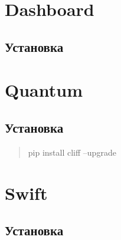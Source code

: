 \documentclass[letterpaper,10pt,russian]{sphinxmanual}
\begin{document}
\chapter{Dashboard}
\label{README:dashboard}\label{README:horizon}

\section{Установка}
\label{README:id17}


\chapter{Quantum}
\label{README:quantum}\label{README:id18}

\section{Установка}
\label{README:id19}\begin{quote}

pip install cliff --upgrade
\end{quote}


\chapter{Swift}
\label{README:id20}\label{README:swift}

\section{Установка}
\label{README:id21}


\renewcommand{\indexname}{Алфавитный указатель}
\printindex
\end{document}
